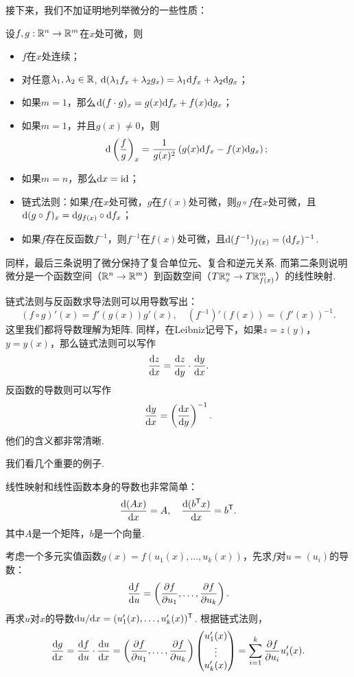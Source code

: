 接下来，我们不加证明地列举微分的一些性质：

\begin{proposition}\label{prop:derivative-property}
    设$f,g:\mathbb{R}^n\to\mathbb{R}^m$在$x$处可微，则
    \begin{itemize}
        \item $f$在$x$处连续；
        \item 对任意$\lambda_1,\lambda_2\in\mathbb{R}$, $\mathrm{d}(\lambda_1 f_x+\lambda_2 g_x)=\lambda_1\mathrm{d} f_x+\lambda_2\mathrm{d} g_x$；
        \item 如果$m=1$，那么$\mathrm{d}(f\cdot g)_x=g(x)\mathrm{d} f_x+f(x)\mathrm{d} g_x$；
        \item 如果$m=1$，并且$g(x)\neq 0$，则
        \[\mathrm{d}\left(\frac{f}{g}\right)_x=\frac{1}{g(x)^2}\left(g(x)\mathrm{d} f_x-f(x)\mathrm{d} g_x\right);\]
        \item 如果$m=n$，那么$\mathrm{d} x=\mathrm{id}$；
        \item 链式法则：如果$f$在$x$处可微，$g$在$f(x)$处可微，则$g\circ f$在$x$处可微，且$\mathrm{d}(g\circ f)_x=\mathrm{d} g_{f(x)}\circ\mathrm{d} f_x$；
        \item 如果$f$存在反函数$f^{-1}$，则$f^{-1}$在$f(x)$处可微，且$\mathrm{d}(f^{-1})_{f(x)}=(\mathrm{d} f_x)^{-1}$.
    \end{itemize}
\end{proposition}
同样，最后三条说明了微分保持了复合单位元、复合和逆元关系. 而第二条则说明微分是一个函数空间（$\mathbb{R}^n\to\mathbb{R}^m$）到函数空间（$T\mathbb{R}_x^n\to T\mathbb{R}^m_{f(x)}$）的线性映射.

链式法则与反函数求导法则可以用导数写出：
\[(f\circ g)'(x)=f'(g(x))g'(x),\quad (f^{-1})'(f(x))=(f'(x))^{-1}.\]
这里我们都将导数理解为矩阵. 同样，在Leibniz记号下，如果$z=z(y)$，$y=y(x)$，那么链式法则可以写作
\[
    \frac{\mathrm{d} z}{\mathrm{d} x}=\frac{\mathrm{d} z}{\mathrm{d} y}\cdot\frac{\mathrm{d} y}{\mathrm{d} x}.
\]
反函数的导数则可以写作
\[
    \frac{\mathrm{d} y}{\mathrm{d} x}=\left(\frac{\mathrm{d} x}{\mathrm{d} y}\right)^{-1}.
\]
他们的含义都非常清晰. 


我们看几个重要的例子. 

\begin{example}\label{ex:linear-derivative}
线性映射和线性函数本身的导数也非常简单：
\[\frac{\mathrm{d} (Ax)}{\mathrm{d} x}=A,\quad \frac{\mathrm{d} (b^{\mathsf{T}} x)}{\mathrm{d} x}=b^{\mathsf{T}}.\]
其中$A$是一个矩阵，$b$是一个向量. 
\end{example}

\begin{example}
    考虑一个多元实值函数$g(x)=f(u_1(x),\dots,u_k(x))$，先求$f$对$u=(u_i)$的导数：
    \[\frac{\mathrm{d} f}{\mathrm{d} u}=\left(\frac{\partial f}{\partial u_1},\dots,\frac{\partial f}{\partial u_k}\right).\]
    再求$u$对$x$的导数$\mathrm{d} u/\mathrm{d} x=(u_1'(x),\dots,u_k'(x))^{\mathsf{T}}$. 根据链式法则，
    \[\frac{\mathrm{d} g}{\mathrm{d} x}=\frac{\mathrm{d} f}{\mathrm{d} u}\cdot\frac{\mathrm{d} u}{\mathrm{d} x}=\left(\frac{\partial f}{\partial u_1},\dots,\frac{\partial f}{\partial u_k}\right)\begin{pmatrix}
        u_1'(x) \\
        \vdots \\
        u_k'(x)
    \end{pmatrix}=\sum_{i=1}^k\frac{\partial f}{\partial u_i}u_i'(x).\]
\end{example}

